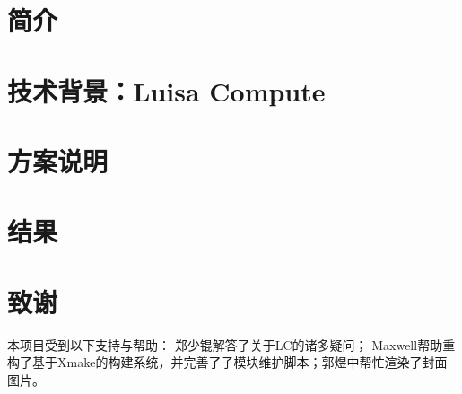 \documentclass[
    coverpage = coverpage.tex,
    fontsetup = font-setup.tex,
    titlesetup = titles-setup.tex
]{si_template/cn_book}
\begin{document}
\frontmatter	%

\mainmatter

\chapter{简介}


\chapter{技术背景：Luisa Compute}


\chapter{方案说明}








\chapter{结果}


\chapter{致谢}
本项目受到以下支持与帮助： 郑少锟解答了关于LC的诸多疑问； Maxwell帮助重构了基于Xmake的构建系统，并完善了子模块维护脚本；郭煜中帮忙渲染了封面图片。



\backmatter
\end{document}
